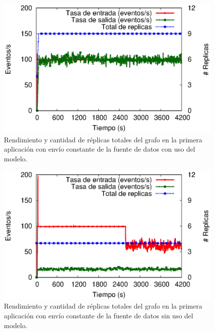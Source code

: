 \begin{figure}[!ht]
	\centering
	\includegraphics[scale=0.65]{images/exp/app1/uniform/cm/processSystem.eps}
    \caption{Rendimiento y cantidad de réplicas totales del grafo en la primera aplicación con envío constante de la fuente de datos con uso del modelo.}
	\label{fig:app1-uniform-processSystem-cm}
\end{figure}

\begin{figure}[!ht]
	\centering
	\includegraphics[scale=0.65]{images/exp/app1/uniform/sm/processSystem.eps}
    \caption{Rendimiento y cantidad de réplicas totales del grafo en la primera aplicación con envío constante de la fuente de datos sin uso del modelo.}
	\label{fig:app1-uniform-processSystem-sm}
\end{figure}


